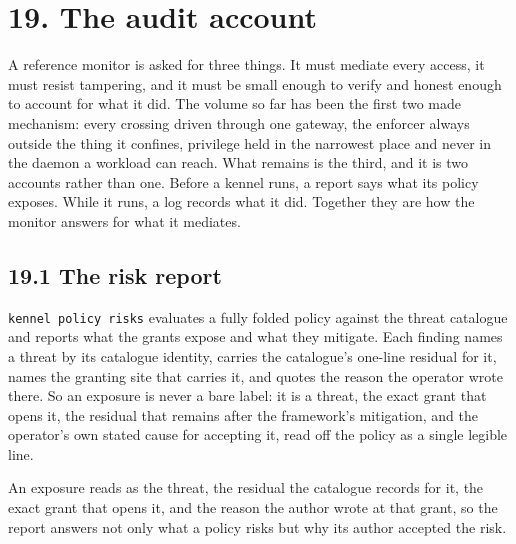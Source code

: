 \hypertarget{the-audit-account}{%
\chapter{19. The audit account}\label{the-audit-account}}

A reference monitor is asked for three things. It must mediate every
access, it must resist tampering, and it must be small enough to verify
and honest enough to account for what it did. The volume so far has been
the first two made mechanism: every crossing driven through one gateway,
the enforcer always outside the thing it confines, privilege held in the
narrowest place and never in the daemon a workload can reach. What
remains is the third, and it is two accounts rather than one. Before a
kennel runs, a report says what its policy exposes. While it runs, a log
records what it did. Together they are how the monitor answers for what
it mediates.

\hypertarget{the-risk-report}{%
\section{19.1 The risk report}\label{the-risk-report}}

\texttt{kennel\ policy\ risks} evaluates a fully folded policy against
the threat catalogue and reports what the grants expose and what they
mitigate. Each finding names a threat by its catalogue identity, carries
the catalogue's one-line residual for it, names the granting site that
carries it, and quotes the reason the operator wrote there. So an
exposure is never a bare label: it is a threat, the exact grant that
opens it, the residual that remains after the framework's mitigation,
and the operator's own stated cause for accepting it, read off the
policy as a single legible line.


An exposure reads as the threat, the residual the catalogue records for
it, the exact grant that opens it, and the reason the author wrote at
that grant, so the report answers not only what a policy risks but why
its author accepted the risk.


